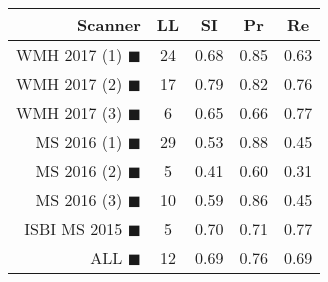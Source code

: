\begin{tabular}{rcccc}
\toprule
Scanner & LL & SI & Pr & Re \\
\midrule
WMH 2017 (1) {\color[rgb]{ 1.00 0.00 0.00}$\blacksquare$} & 24 & 0.68 & 0.85 & 0.63 \\
WMH 2017 (2) {\color[rgb]{ 1.00 0.50 0.00}$\blacksquare$} & 17 & 0.79 & 0.82 & 0.76 \\
WMH 2017 (3) {\color[rgb]{ 1.00 0.80 0.00}$\blacksquare$} & 6 & 0.65 & 0.66 & 0.77 \\
MS  2016 (1) {\color[rgb]{ 0.20 0.80 0.00}$\blacksquare$} & 29 & 0.53 & 0.88 & 0.45 \\
MS  2016 (2) {\color[rgb]{ 0.00 0.40 1.00}$\blacksquare$} & 5 & 0.41 & 0.60 & 0.31 \\
MS  2016 (3) {\color[rgb]{ 0.60 0.00 1.00}$\blacksquare$} & 10 & 0.59 & 0.86 & 0.45 \\
ISBI MS 2015 {\color[rgb]{ 1.00 0.00 1.00}$\blacksquare$} & 5 & 0.70 & 0.71 & 0.77 \\
\midrule
ALL {\color[rgb]{ 1.00 1.00 1.00}$\blacksquare$} & 12 & 0.69 & 0.76 & 0.69 \\
\bottomrule
\end{tabular}